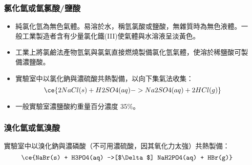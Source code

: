 \documentclass[a4paper,12pt]{report}
\begin{document}
\subsubsection{氯化氫或氫氯酸/鹽酸}
\begin{itemize}
\item 純氯化氫為無色氣體。易溶於水，稱氫氯酸或鹽酸，無雜質時為無色液體。一般工業製造者含有少量氯化鐵(III)使氣體與水溶液呈淡黃色。
\item 工業上將氯鹼法產物氫氣與氯氣直接燃燒製備氯化氫氣體，使溶於稀鹽酸可製備濃鹽酸。
\item 實驗室中以氯化鈉與濃硫酸共熱製備，以向下集氣法收集：
\[\ce{2NaCl(s) + H2SO4(aq) -> Na2SO4(aq) + 2HCl(g)}\]
\item 一般實驗室濃鹽酸約重量百分濃度 35\%。
\end{itemize}
\subsubsection{溴化氫或氫溴酸}
實驗室中以溴化鈉與濃磷酸（不可用濃硫酸，因其氧化力太強）共熱製備：
\[\ce{NaBr(s) + H3PO4(aq) ->[$\Delta$] NaH2PO4(aq) + HBr(g)}\]
\end{document}

